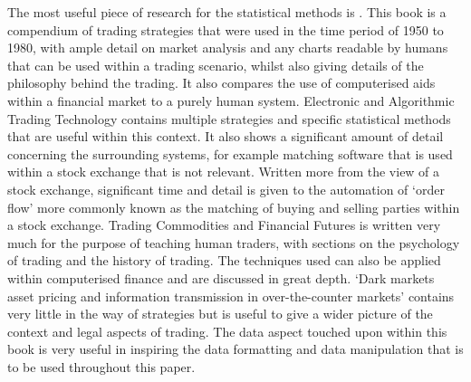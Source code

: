 \documentclass[conference]{IEEEtran}
\begin{document}
The most useful piece of research for the statistical methods is \cite{Murphy1999}. This book is a compendium of trading strategies that were used in the time period of 1950 to 1980, with ample detail on market analysis and any charts readable by humans that can be used within a trading scenario, whilst also giving details of the philosophy behind the trading. It also compares the use of computerised aids within a financial market to a purely human system. Electronic and Algorithmic Trading Technology \cite{Kim2007} contains multiple strategies and specific statistical methods that are useful within this context. It also shows a significant amount of detail concerning the surrounding systems, for example matching software that is used within a stock exchange that is not relevant. Written more from the view of a stock exchange, significant time and detail is given to the automation of `order flow' more commonly known as the matching of buying and selling parties within a stock exchange. Trading Commodities and Financial Futures \cite{Kleinman2005} is written very much for the purpose of teaching human traders, with sections on the psychology of trading and the history of trading. The techniques used can also be applied within computerised finance and are discussed in great depth. `Dark markets asset pricing and information transmission in over-the-counter markets' \cite{Duffie2012} contains very little in the way of strategies but is useful to give a wider picture of the context and legal aspects of trading. The data aspect touched upon within this book is very useful in inspiring the data formatting and data manipulation that is to be used throughout this paper.
\end{document}
